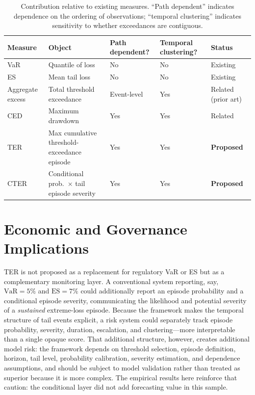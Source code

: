 \documentclass[11pt]{article}
\newcommand{\VaR}{\mathrm{VaR}}
\newcommand{\ES}{\mathrm{ES}}
\begin{document}
\begin{table}[h]
\centering
\caption{Contribution relative to existing measures. ``Path dependent'' indicates dependence on the ordering
of observations; ``temporal clustering'' indicates sensitivity to whether exceedances are contiguous.}
\label{tab:contribution}
\begin{tabular}{lllll}
\toprule
Measure & Object & Path dependent? & Temporal clustering? & Status \\
\midrule
VaR & Quantile of loss & No & No & Existing \\
ES & Mean tail loss & No & No & Existing \\
Aggregate excess & Total threshold exceedance & Event-level & Yes & Related (prior art) \\
CED & Maximum drawdown & Yes & Yes & Related \\
TER & Max cumulative threshold-exceedance episode & Yes & Yes & \textbf{Proposed} \\
CTER & Conditional prob.\ $\times$ tail episode severity & Yes & Yes & \textbf{Proposed} \\
\bottomrule
\end{tabular}
\end{table}

\section{Economic and Governance Implications}\label{sec:econ}

TER is not proposed as a replacement for regulatory VaR or ES but as a complementary monitoring layer. A
conventional system reporting, say, $\VaR=5\%$ and $\ES=7\%$ could additionally report an episode
probability and a conditional episode severity, communicating the likelihood and potential severity of a
\emph{sustained} extreme-loss episode. Because the framework makes the temporal structure of tail events
explicit, a risk system could separately track episode probability, severity, duration, escalation, and
clustering---more interpretable than a single opaque score. That additional structure, however, creates
additional model risk: the framework depends on threshold selection, episode definition, horizon, tail
level, probability calibration, severity estimation, and dependence assumptions, and should be subject to
model validation rather than treated as superior because it is more complex. The empirical results here
reinforce that caution: the conditional layer did not add forecasting value in this sample.
\end{document}
